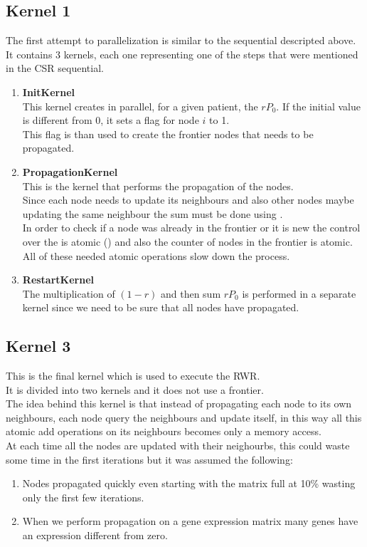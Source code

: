 \documentclass[a4paper]{article}
\begin{document}
\subsection{Kernel 1}
The first attempt to parallelization is similar to the sequential descripted above.\\
It contains 3 kernels, each one representing one of the steps that were
mentioned in the CSR sequential.
\begin{enumerate}
    \item \textbf{InitKernel}\\
        This kernel creates in parallel, for a given patient, the $rP_0$.
        If the initial value is different from 0, it sets a flag for node $i$ to 1.\\
        This flag is than used to create the frontier nodes that needs to be
        propagated.
    \item \textbf{PropagationKernel} \\
        This is the kernel that performs the propagation of the nodes.\\
        Since each node needs to update its neighbours and also other nodes
        maybe updating the same neighbour the sum must be done using
        .\\
        In order to check if a node was already in the frontier or it is
        new the control over the  is atomic ()
        and also the counter of nodes in the frontier is atomic.\\
        All of these needed atomic operations slow down the process.
    \item \textbf{RestartKernel} \\
        The multiplication of $(1-r)$ and then sum $rP_0$ is performed in a
        separate kernel since we need to be sure that all nodes have propagated.
\end{enumerate}

\subsection{Kernel 3}
This is the final kernel which is used to execute the RWR.\\
It is divided into two kernels and it does not use a frontier.\\
The idea behind this kernel is that instead of propagating each node to its own
neighbours, each node query the neighbours and update itself, in this way all
this atomic add operations on its neighbours becomes only a memory access.\\
At each time all the nodes are updated with their neighourbs, this could waste
some time in the first iterations but it was assumed the following:
\begin{enumerate}
    \item Nodes propagated quickly even starting with the matrix full at 10\%
        wasting only the first few iterations.
    \item When we perform propagation on a gene expression matrix many genes
        have an expression different from zero.
\end{enumerate}
\end{document}

